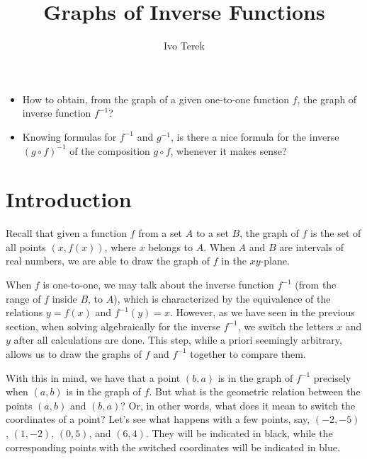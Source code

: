 \documentclass[nooutcomes]{ximera}
\author{Ivo Terek}
\title{Graphs of Inverse Functions}
\begin{document}
\begin{abstract}
  
\end{abstract}
\maketitle



\begin{motivatingQuestions}\begin{itemize}
  \item How to obtain, from the graph of a given one-to-one function $f$, the graph of inverse function $f^{-1}$?
    \item Knowing formulas for $f^{-1}$ and $g^{-1}$, is there a nice formula for the inverse $(g\circ f)^{-1}$ of the composition $g\circ f$, whenever it makes sense?
\end{itemize}\end{motivatingQuestions}



\section{Introduction}

Recall that given a function $f$ from a set $A$ to a set $B$, the graph of $f$ is the set of all points $(x,f(x))$, where $x$ belongs to $A$. When $A$ and $B$ are intervals of real numbers, we are able to draw the graph of $f$ in the $xy$-plane.

When $f$ is one-to-one, we may talk about the inverse function $f^{-1}$ (from the range of $f$ inside $B$, to $A$), which is characterized by the equivalence of the relations $y=f(x)$ and $f^{-1}(y) = x$. However, as we have seen in the previous section, when solving algebraically for the inverse $f^{-1}$, we switch the letters $x$ and $y$ after all calculations are done. This step, while a priori seemingly arbitrary, allows us to draw the graphs of $f$ and $f^{-1}$ together to compare them.

With this in mind, we have that a point $(b,a)$ is in the graph of $f^{-1}$ precisely when $(a,b)$ is in the graph of $f$. But what is the geometric relation between the points $(a,b)$ and $(b,a)$? Or, in other words, what does it mean to switch the coordinates of a point? Let's see what happens with a few points, say, $(-2,-5)$, $(1,-2)$, $(0,5)$, and $(6,4)$. They will be indicated in black, while the corresponding points with the switched coordinates will be indicated in blue.
\end{document}
